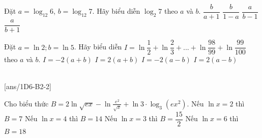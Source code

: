 \begin{ex}
	Đặt $a=\log_{12}6$, $b=\log_{12} 7$. Hãy biểu diễn $\log_{2} 7$ theo $a$ và $b$.
	\choice
	{$\dfrac{b}{a+1}$}
	{\True $\dfrac{b}{1-a}$}
	{$\dfrac{a}{b-1}$}
	{$\dfrac{a}{b+1}$}
\end{ex}

\begin{ex}
	Đặt $a=\ln 2; b=\ln 5$. Hãy biểu diễn $I=\ln\dfrac{1}{2}+\ln\dfrac{2}{3}+...+\ln\dfrac{98}{99}+\ln\dfrac{99}{100}$ theo $a$ và $b$.
	\choice
	{\True $I=-2(a+b)$}
	{$I=2(a+b)$}
	{$I=-2(a-b)$}
	{$I=2(a-b)$}
\end{ex}


 \\
[ans/1D6-B2-2]

\begin{ex}
	Cho biểu thức $B=2 \ln \sqrt{e x}-\ln \frac{e^2}{\sqrt{x}}+\ln 3 \cdot \log _3\left(e x^2\right)$.
	\choiceTF
	{\True Nếu $\ln x=2$ thì $B=7$}
	{\True Nếu $\ln x=4$ thì $B=14$}
	{\True Nếu $\ln x=3$ thì $B=\dfrac{15}{2}$}
	{Nếu $\ln x=6$ thì $B=18$}
	\loigiai{
		
	}
\end{ex}

